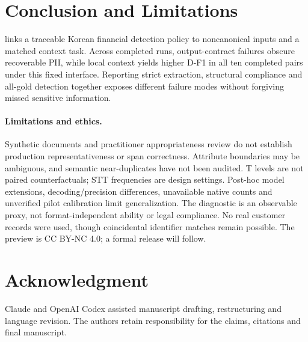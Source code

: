 \section{Conclusion and Limitations}
\label{sec:conclusion}

\kiii{} links a traceable Korean financial detection policy to noncanonical inputs and a matched context task. Across completed runs, output-contract failures obscure recoverable PII, while local context yields higher D-F1 in all ten completed pairs under this fixed interface. Reporting strict extraction, structural compliance and all-gold detection together exposes different failure modes without forgiving missed sensitive information.

\paragraph{Limitations and ethics.}
Synthetic documents and practitioner appropriateness review do not establish production representativeness or span correctness. Attribute boundaries may be ambiguous, and semantic near-duplicates have not been audited. T levels are not paired counterfactuals; STT frequencies are design settings. Post-hoc model extensions, decoding/precision differences, unavailable native counts and unverified pilot calibration limit generalization. The diagnostic is an observable proxy, not format-independent ability or legal compliance. No real customer records were used, though coincidental identifier matches remain possible. The preview is CC BY-NC 4.0; a formal release will follow.

\section*{Acknowledgment}
Claude and OpenAI Codex assisted manuscript drafting, restructuring and language revision. The authors retain responsibility for the claims, citations and final manuscript.

